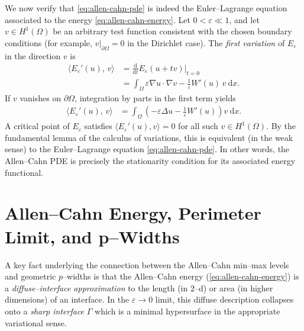 We now verify that \eqref{eq:allen-cahn-pde} is indeed the Euler–Lagrange equation associated to the energy \eqref{eq:allen-cahn-energy}. Let $0 < \varepsilon \ll 1$, and let $v\in H^{1}(\Omega)$ be an arbitrary test function consistent with the chosen boundary conditions (for example, $v|_{\partial\Omega}=0$ in the Dirichlet case). The \emph{first variation} of $E_\varepsilon$ in the direction $v$ is
\begin{align*}
  \big\langle E_\varepsilon'(u),\,v \big\rangle
  &= \frac{\mathrm d}{\mathrm dt} E_\varepsilon(u+tv)\bigg|_{t=0} \\
  &= \int_{\Omega} \varepsilon \nabla u\cdot\nabla v-\frac{1}{\varepsilon} W'(u) \, v \ \mathrm dx.
\end{align*}
If $v$ vanishes on $\partial\Omega$, integration by parts in the first term yields
\begin{align*}
  \big\langle E_\varepsilon'(u),\,v \big\rangle
  &= \int_{\Omega} \left(-\varepsilon \Delta u-\frac{1}{\varepsilon} W'(u) \right) v \ \mathrm dx.
\end{align*}
A critical point of $E_\varepsilon$ satisfies $\langle E_\varepsilon'(u),v\rangle=0$ for all such $v\in H^1(\Omega)$. By the fundamental lemma of the calculus of variations, this is equivalent (in the weak sense) to the Euler–Lagrange equation \eqref{eq:allen-cahn-pde}. In other words, the Allen–Cahn PDE is precisely the stationarity condition for its associated energy functional.

\section{Allen–Cahn Energy, Perimeter Limit, and p–Widths}\label{sec:Modica-Mortola}

\noindent
A key fact underlying the connection between the Allen--Cahn min--max levels and geometric $p$--widths is that the Allen--Cahn energy (\ref{eq:allen-cahn-energy}) is a \emph{diffuse–interface approximation} to the length (in $2$--d) or area (in higher dimensions) of an interface. In the $\varepsilon \to 0$ limit, this diffuse description collapses onto a \emph{sharp interface} $\Gamma$ which is a minimal hypersurface in the appropriate variational sense.

